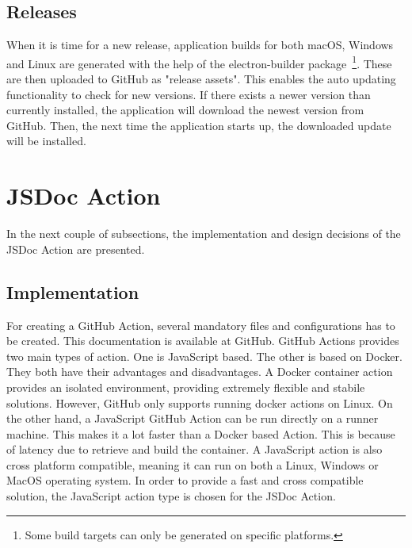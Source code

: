 \subsection{Releases}
When it is time for a new release, application builds for both macOS, Windows and Linux are generated with the help of the electron-builder package~\footnote{Some build targets can only be generated on specific platforms.}. These are then uploaded to GitHub as "release assets".
This enables the auto updating functionality to check for new versions. If there exists a newer version than currently installed, the application will download the newest version from GitHub. Then, the next time the application starts up, the downloaded update will be installed.

\section{JSDoc Action}
In the next couple of subsections, the implementation and design decisions of the JSDoc Action are presented.
\subsection{Implementation}
For creating a GitHub Action, several mandatory files and configurations has to be created. This documentation is available at GitHub. GitHub Actions provides two main types of action. One is JavaScript based. The other is based on Docker. They both have their advantages and disadvantages. A Docker container action provides an isolated environment, providing extremely flexible and stabile solutions. However, GitHub only supports running docker actions on Linux. On the other hand, a JavaScript GitHub Action can be run directly on a runner machine. This makes it a lot faster than a Docker based Action. This is because of latency due to retrieve and build the container. A JavaScript action is also cross platform compatible, meaning it can run on both a Linux, Windows or MacOS operating system. In order to provide a fast and cross compatible solution, the JavaScript action type is chosen for the JSDoc Action.


